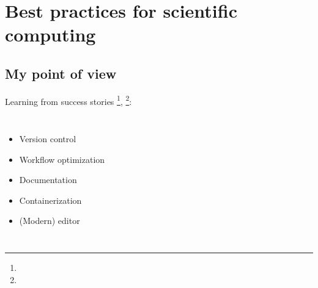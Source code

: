 \documentclass[usenames,dvipsnames]{beamer}
\theoremstyle{plain}
\theoremstyle{definition}
\begin{document}
\section{Best practices for scientific computing}
\subsection{My point of view}

\begin{frame}{\setframetitle{}}
  Learning from success stories  \footnote{}, \footnote{}:
  
  \begin{columns}[t]
    
    \begin{itemize}
      \item Version control 
      
      \item Workflow optimization
      
      \item Documentation

      \item Containerization
      
      \item (Modern) editor
    \end{itemize}
    
  \end{columns}
  
\end{frame}



\end{document}
